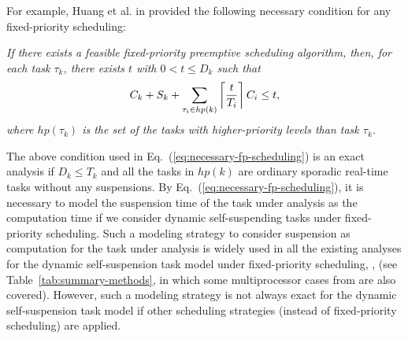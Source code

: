 For example, Huang et al. in \cite[Theorem 3]{huangpass:dac2015} provided the following necessary condition for any fixed-priority scheduling: 

\emph{ If there exists a feasible fixed-priority preemptive scheduling
  algorithm, then, for each task $\tau_k$, there exists $t$ with $0 < t \leq D_k$ such that}
  \begin{equation}
    \label{eq:necessary-fp-scheduling}
    C_k+S_k + \sum_{\tau_i \in
      hp(k)} \left\lceil{\frac{t}{T_i}}\right\rceil C_i   \leq t,
  \end{equation}
\emph{where $hp(\tau_k)$ is the set of the tasks with higher-priority levels than task $\tau_k$.} 

The above condition used in Eq.~(\ref{eq:necessary-fp-scheduling}) is an exact analysis if $D_k \leq T_k$ and all the tasks in $hp(k)$ are ordinary sporadic real-time tasks without any suspensions. By Eq.~(\ref{eq:necessary-fp-scheduling}), it is necessary to model the suspension time of the task under analysis as the computation time if we consider dynamic self-suspending tasks under fixed-priority scheduling. Such a modeling strategy to consider suspension as computation for the task under analysis is widely used in all the existing analyses for the dynamic self-suspension task model under fixed-priority scheduling, \eg, \cite{LiuChen:rtss2014,huangpass:dac2015,MingLiRTCSA1994,RTCSA-KimCPKH95,RTAS-AudsleyB04,ECRTS-AudsleyB04,Liu:2000:RS:518501} (see Table~\ref{tab:summary-methods}, in which some multiprocessor cases from \cite{DBLP:conf/ecrts/LiuA13,DBLP:conf/ecrts/LiuCH014} are also covered). However, such a modeling strategy is not always exact for the dynamic self-suspension task model if other scheduling strategies (instead of fixed-priority scheduling) are applied.



